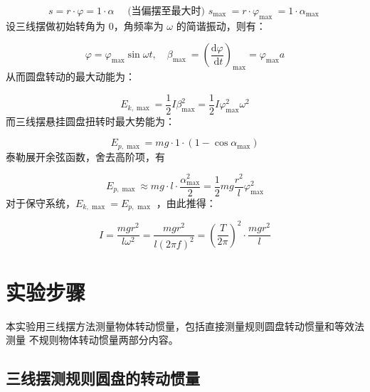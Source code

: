 \documentclass{article}
\begin{document}
$$
 s=r \cdot \varphi=1 \cdot \alpha \quad \text { (当偏摆至最大时) } s_{\text {max }}=r \cdot \varphi_{\text {max }}=1 \cdot \alpha_{\text {max }} 
$$      
设三线摆做初始转角为 0，角频率为 $\omega$ 的简谐振动，则有：
        
$$
\varphi=\varphi_{\max } \sin \omega t, \quad \beta_{\text {max }}=\left(\frac{\mathrm{d} \varphi}{\mathrm{~d} t}\right)_{\max }=\varphi_{\max } a
$$   
从而圆盘转动的最大动能为：
    
$$
E_{k, \max }=\frac{1}{2} I \beta_{\max }^2=\frac{1}{2} I \varphi_{\max }^2 \omega^2
$$ 
而三线摆悬挂圆盘扭转时最大势能为：

$$
E_{p, \max }=m g \cdot 1 \cdot\left(1-\cos \alpha_{\max }\right)
$$   
泰勒展开余弦函数，舍去高阶项，有
    
$$
E_{p, \max } \approx m g \cdot l \cdot \frac{\alpha_{\max }^2}{2}=\frac{1}{2} m g \frac{r^2}{l} \varphi_{\max }^2
$$
对于保守系统，$E_{k, \text { max }}=E_{p, \text { max }}$ ，由此推得：
    
$$
I=\frac{m g r^2}{l \omega^2}=\frac{m g r^2}{l(2 \pi f)^2}=\left(\frac{T}{2 \pi}\right)^2 \cdot \frac{m g r^2}{l}
$$
    
\section{实验步骤}
本实验用三线摆方法测量物体转动惯量，包括直接测量规则圆盘转动惯量和等效法测量
不规则物体转动惯量两部分内容。 
\subsection{三线摆测规则圆盘的转动惯量 }
\end{document}
